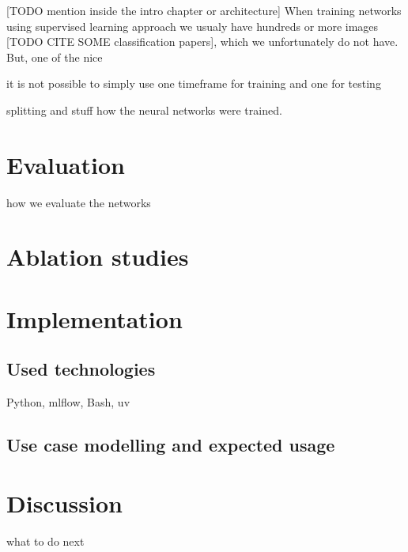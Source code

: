 \documentclass[
  digital,     %
  oneside,     %
  nosansbold,  %
  nocolorbold, %
  lof,         %
  lot,         %
]{fithesis4}
\begin{document}
[TODO mention inside the intro chapter or architecture]
When training
networks using supervised learning approach we usualy have hundreds or more
images [TODO CITE SOME classification papers], which we unfortunately do not
have. But, one of the nice 

it is not possible to simply use one timeframe for training
and one for testing 

splitting and stuff
how the neural networks were trained.

\chapter{Evaluation}
how we evaluate the networks

\chapter{Ablation studies}

\chapter{Implementation}

\section{Used technologies}
Python, mlflow, Bash, uv

\section{Use case modelling and expected usage}

\chapter{Discussion}
what to do next
\end{document}
